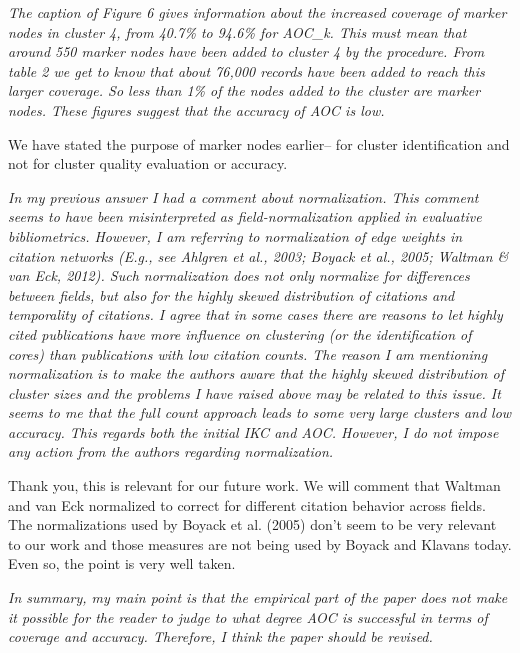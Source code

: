 \documentclass[11pt, oneside]{article}   	%
\begin{document}
\vspace{2 mm} 
 \emph{The caption of Figure 6 gives information about the increased coverage of marker nodes in cluster 4, from 40.7\% to 94.6\% for AOC\_k. This must mean that around 550 marker nodes have been added to cluster 4 by the procedure. From table 2 we get to know that about 76,000 records have been added to reach this larger coverage. So less than 1\% of the nodes added to the cluster are marker nodes. These figures suggest that the accuracy of AOC is low.}
\vspace{2 mm} 

\vspace{2 mm} 
We have stated the purpose of marker nodes earlier-- for cluster identification and not for cluster quality evaluation or accuracy.

\vspace{2 mm} 
 \emph{ In my previous answer I had a comment about normalization. This comment seems to have been misinterpreted as field-normalization applied in evaluative bibliometrics. However, I am referring to normalization of edge weights in citation networks (E.g., see Ahlgren et al., 2003; Boyack et al., 2005; Waltman \& van Eck, 2012). Such normalization does not only normalize for differences between fields, but also for the highly skewed distribution of citations and temporality of citations. I agree that in some cases there are reasons to let highly cited publications have more influence on clustering (or the identification of cores) than publications with low citation counts. The reason I am mentioning normalization is to make the authors aware that the highly skewed distribution of cluster sizes and the problems I have raised above may be related to this issue. It seems to me that the full count approach leads to some very large clusters and low accuracy. This regards both the initial IKC and AOC. However, I do not impose any action from the authors regarding normalization.}
 
 \vspace{2 mm} 
 Thank you, this is relevant for our future work. We will comment that Waltman and van Eck normalized to correct for different citation behavior across fields. The normalizations used by Boyack et al. (2005) don't seem to be very relevant to our work and those measures are not being used by Boyack and Klavans today. Even so, the point is very well taken. 

\vspace{2 mm} 
 \emph{In summary, my main point is that the empirical part of the paper does not make it possible for the reader to judge to what degree AOC is successful in terms of coverage and accuracy. Therefore, I think the paper should be revised.}  
 
\end{document}
